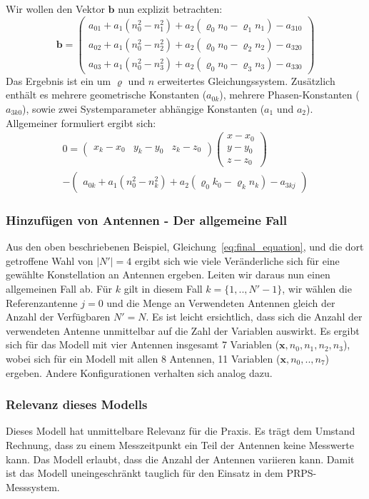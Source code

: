 {%
Wir wollen den Vektor $\mathbf{b}$ nun explizit betrachten:
%
\begin{equation}
\mathbf{b}=
\left(
	\begin{array}{c}
		a_{01}+a_1( n_0^2-n_1^2)+a_2(\varrho_0n_0-\varrho_1n_1)-a_{310} \\
		a_{02}+a_1(n_0^2-n_2^2)+a_2(\varrho_0n_0-\varrho_2n_2)-a_{320} \\
		a_{03}+a_1(n_0^2-n_3^2)+a_2(\varrho_0n_0-\varrho_3n_3)-a_{330}
	\end{array}
\right)
\end{equation}
%
Das Ergebnis ist ein um $\varrho$ und $n$ erweitertes Gleichungssystem. Zusätzlich enthält  es mehrere geometrische Konstanten ($a_{0k}$), mehrere Phasen-Konstanten ($a_{3k0}$), sowie zwei Systemparameter abhängige Konstanten ($a_1$ und $a_2$). Allgemeiner formuliert ergibt sich:
%
\begin{multline}\label{eq:final_equation}
0=
\left(
	\begin{array}{ccc}
		x_k-x_0 & y_k-y_0 & z_k-z_0 
	\end{array}
\right)
\left(
   \begin{array}{c}
	   x-x_0\\
	   y-y_0\\
	   z-z_0
   \end{array}
\right) \\
-
\left(
	\begin{array}{c}
		a_{0k}+a_1(n_0^2-n_k^2)+a_2(\varrho_0k_0-\varrho_kn_k)-a_{3kj}
	\end{array}
	\right)
\end{multline}
%
\subsubsection{Hinzufügen von Antennen - Der allgemeine Fall}
Aus den oben beschriebenen Beispiel, Gleichung~\eqref{eq:final_equation}, und die dort getroffene Wahl von $|N'|=4$ ergibt sich wie viele Veränderliche sich für eine gewählte Konstellation an Antennen ergeben. Leiten wir daraus nun einen allgemeinen Fall ab. Für $k$ gilt in diesem Fall $k=\{1,..,N'-1\}$, wir wählen die Referenzantenne $j=0$ und die Menge an Verwendeten Antennen gleich der Anzahl der Verfügbaren $N'=N$. Es ist leicht ersichtlich, dass sich die Anzahl der verwendeten Antenne unmittelbar auf die Zahl der Variablen auswirkt. Es ergibt sich für das Modell mit vier Antennen insgesamt 7 Variablen ($\mathbf{x},n_0,n_1,n_2,n_3$), wobei sich für ein Modell mit allen 8 Antennen, 11 Variablen ($\mathbf{x},n_0,..,n_7$) ergeben. Andere Konfigurationen verhalten sich analog dazu.
%
\subsubsection{Relevanz dieses Modells}
Dieses Modell hat unmittelbare Relevanz für die Praxis. Es trägt dem Umstand Rechnung, dass zu einem Messzeitpunkt ein Teil der Antennen keine Messwerte kann. Das Modell erlaubt, dass die Anzahl der Antennen variieren kann. Damit ist das Modell uneingeschränkt tauglich für den Einsatz in dem PRPS-Messsystem.\\
}